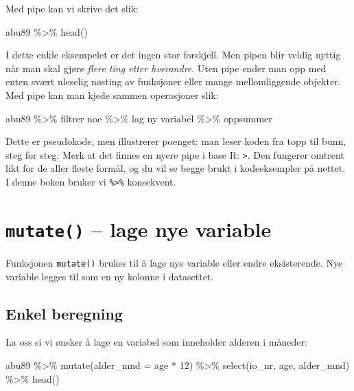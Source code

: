 \documentclass[
  norsk,
  letterpaper,
  DIV=11,
  numbers=noendperiod]{scrreprt}
\newenvironment{Shaded}{\begin{snugshade}}{\end{snugshade}}
\newcommand{\AttributeTok}[1]{\textcolor[rgb]{0.40,0.45,0.13}{#1}}
\newcommand{\DecValTok}[1]{\textcolor[rgb]{0.68,0.00,0.00}{#1}}
\newcommand{\FunctionTok}[1]{\textcolor[rgb]{0.28,0.35,0.67}{#1}}
\newcommand{\NormalTok}[1]{\textcolor[rgb]{0.00,0.23,0.31}{#1}}
\newcommand{\SpecialCharTok}[1]{\textcolor[rgb]{0.37,0.37,0.37}{#1}}
\theoremstyle{definition}
\theoremstyle{remark}
\begin{document}
Med pipe kan vi skrive det slik:

\begin{Shaded}
\begin{Highlighting}[]
\NormalTok{abu89 }\SpecialCharTok{\%\textgreater{}\%} \FunctionTok{head}\NormalTok{()}
\end{Highlighting}
\end{Shaded}

I dette enkle eksempelet er det ingen stor forskjell. Men pipen blir
veldig nyttig når man skal gjøre \emph{flere ting etter hverandre}. Uten
pipe ender man opp med enten svært uleselig nøsting av funksjoner eller
mange mellomliggende objekter. Med pipe kan man kjede sammen operasjoner
slik:

\begin{Shaded}
\begin{Highlighting}[]
\NormalTok{abu89 }\SpecialCharTok{\%\textgreater{}\%}
\NormalTok{  filtrer noe }\SpecialCharTok{\%\textgreater{}\%}
\NormalTok{  lag ny variabel }\SpecialCharTok{\%\textgreater{}\%}
\NormalTok{  oppsummer}
\end{Highlighting}
\end{Shaded}

Dette er pseudokode, men illustrerer poenget: man leser koden fra topp
til bunn, steg for steg. Merk at det finnes en nyere pipe i base R:
\texttt{\textbar{}\textgreater{}}. Den fungerer omtrent likt for de
aller fleste formål, og du vil se begge brukt i kodeeksempler på nettet.
I denne boken bruker vi \texttt{\%\textgreater{}\%} konsekvent.

\section{\texorpdfstring{\texttt{mutate()} -- lage nye
variable}{mutate() -- lage nye variable}}\label{mutate-lage-nye-variable}

Funksjonen \texttt{mutate()} brukes til å lage nye variable eller endre
eksisterende. Nye variable legges til som en ny kolonne i datasettet.

\subsection{Enkel beregning}\label{enkel-beregning}

La oss si vi ønsker å lage en variabel som inneholder alderen i måneder:

\begin{Shaded}
\begin{Highlighting}[]
\NormalTok{abu89 }\SpecialCharTok{\%\textgreater{}\%}
  \FunctionTok{mutate}\NormalTok{(}\AttributeTok{alder\_mnd =}\NormalTok{ age }\SpecialCharTok{*} \DecValTok{12}\NormalTok{) }\SpecialCharTok{\%\textgreater{}\%}
  \FunctionTok{select}\NormalTok{(io\_nr, age, alder\_mnd) }\SpecialCharTok{\%\textgreater{}\%}
  \FunctionTok{head}\NormalTok{()}
\end{Highlighting}
\end{Shaded}
\end{document}
